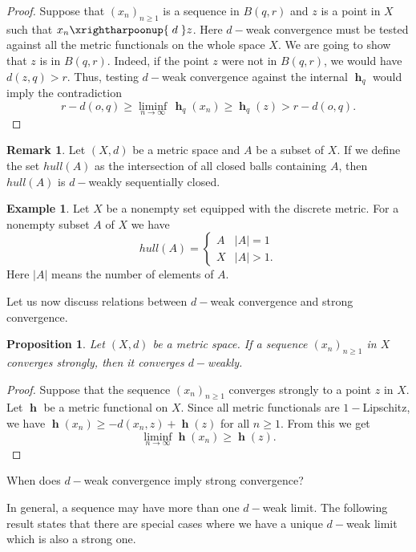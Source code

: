 \documentclass[a4paper,12pt]{article}
\newtheorem{prop}[thm]{Proposition}
\theoremstyle{definition}
\newtheorem{ex}[thm]{Example}
\newtheorem{rem}[thm]{Remark}
\DeclareMathOperator{\h}{\mathbf{h}}
\numberwithin{equation}{section}
\begin{document}
\begin{proof}  
Suppose that $(x_n)_{n\geq 1}$ is a sequence in $B(q,r)$ and $z$ is a point in 
$X$ such that $x_n \xrightharpoonup{\;d\;} z$. Here $d-$weak convergence must 
be tested against all the metric functionals on the whole space $X$. We are 
going to show that $z$ is in $B(q,r)$. Indeed, if the point $z$ were not in 
$B(q,r)$, we would have $d(z,q) > r$. Thus, testing $d-$weak convergence against 
the internal $\h_q$ would imply the contradiction
$$ 
	r-d(o,q)\geq \liminf_{n\to\infty}\,\h_q(x_n) 
	\geq \h_q(z) >  r - d(o,q). 
$$
\end{proof}

\begin{rem}
Let $(X,d)$ be a metric space and $A$ be a subset of $X$. If we define the set 
$hull(A)$ as the intersection of all closed balls containing $A$, then $hull(A)$ 
is $d-$weakly sequentially closed.
\end{rem} 

\begin{ex}  
Let $X$ be a nonempty set equipped with the discrete metric. For a nonempty subset 
$A$ of $X$ we have 
$$
	hull(A) = \begin{cases} 
		A & |A| = 1 \\
		X & |A| > 1.
	\end{cases}
$$
Here $|A|$ means the number of elements of $A$.
\end{ex}

Let us now discuss relations between $d-$weak convergence and strong convergence.

\begin{prop}
Let $(X,d)$ be a metric space. If a sequence $(x_n)_{n\geq 1}$ in $X$ converges 
strongly, then it converges $d-$weakly.
\end{prop}

\begin{proof}
Suppose that the sequence $(x_n)_{n\geq 1}$ converges strongly to a point $z$ in 
$X$. Let $\h$ be a metric functional on $X$. Since all metric functionals are 
$1-$Lipschitz, we have $\h(x_n) \geq -d(x_n,z) + \h(z)$ for all $n\geq 1$. From 
this we get 
$$
	\liminf_{n\to\infty}\h(x_n)\geq \h(z).
$$
\end{proof}

When does $d-$weak convergence imply strong convergence? 

In general, a sequence may have more than one $d-$weak limit. The following
result states that there are special cases where we have a unique $d-$weak 
limit which is also a strong one.
\end{document}
